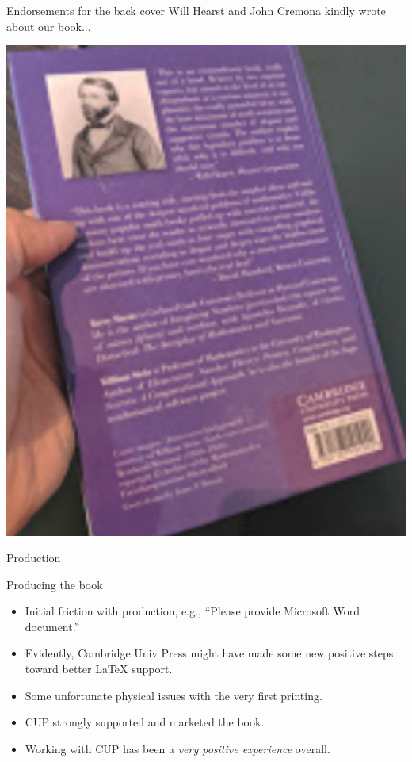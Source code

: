 \documentclass{beamer}
\begin{document}
\begin{frame}{Endorsements for the back cover}
Will Hearst and John Cremona kindly wrote about our book...

  \begin{center}
    \includegraphics[height=.7\textheight]{pics/cover-back}
  \end{center}
\end{frame}

\begin{frame}{Production}
\begin{block}{Producing the book}
  \begin{itemize}
  \item Initial friction with production, e.g., ``Please provide Microsoft Word document.''
    \item Evidently, Cambridge Univ Press might have made some new positive steps toward better \LaTeX{} support.
    \item Some unfortunate physical issues with the very first printing.
    \item CUP strongly supported and marketed the book.
    \item Working with CUP has been a {\em very positive experience} overall.
  \end{itemize}
\end{block}
\end{frame}
\end{document}
